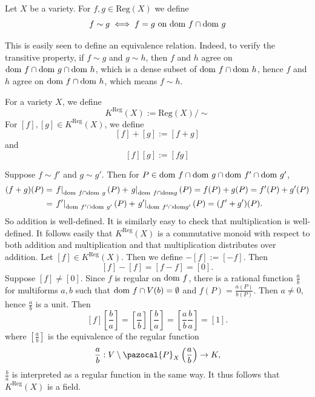     \begin{definition}
        Let $X$ be a variety. For $f,g\in \mathrm{Reg}(X)$ we define 
        $$
            f\sim g \iff f=g \text{ on } \mathrm{dom}\ f \cap \mathrm{dom} \ g
        $$
    \end{definition}
    \begin{remark}
        This is easily seen to define an equivalence relation. Indeed, to verify the transitive property, if $f\sim g$ and $g\sim h$, then $f$ and $h$ agree on $\dom\ f \cap \dom \ g\cap \dom\ h$, which is a dense subset of $\dom \ f \cap \dom \ h$, hence $f$ and $h$ agree on $\dom \ f \cap \dom \ h$, which means $f\sim h$.  
    \end{remark}
    \begin{definition}
        For a variety $X$, we define
        $$
            K^{\mathrm{Reg}}(X) := \mathrm{Reg}(X)/\sim
        $$
        For $[f],[g]\in K^\mathrm{Reg}(X)$, we define
        $$
            [f]+[g] := [f+g]
        $$
        and 
        $$
            [f][g] := [fg]
        $$
    \end{definition}
    \begin{remark}
        Suppose $f\sim f'$ and $g\sim g'$. Then for $P\in \mathrm{dom}\ f \cap \mathrm{dom} \ g \cap \mathrm{dom}\ f' \cap \mathrm{dom} \ g'$,
        \begin{align*}
            (f+g)(P) &= \left. f\right|_{\mathrm{dom}\ f\cap \mathrm{dom} \ g}(P) +\left. g\right|_{\mathrm{dom} \ f\cap \mathrm{dom} g}(P) = f(P)+g(P)= f'(P)+g'(P)\\
            &=\left. f'\right|_{\mathrm{dom}\ f'\cap \mathrm{dom} \ g'}(P) +\left. g'\right|_{\mathrm{dom} \ f'\cap \mathrm{dom} g'}(P) = (f'+g')(P).
        \end{align*}
        So addition is well-defined. It is similarly easy to check that multiplication is well-defined. It follows easily that $K^\mathrm{Reg}(X)$ is a commutative monoid with respect to both addition and multiplication and that multiplication distributes over addition. Let $[f]\in K^\mathrm{Reg}(X)$. Then we define $-[f]:= [-f]$. Then 
        $$
            [f]-[f]=[f-f]=[0].
        $$
        Suppose $[f]\neq [0]$. Since $f$ is regular on $\mathrm{dom}\ f$, there is a rational function $\frac{a}{b}$ for multiforms $a,b$ such that $\mathrm{dom}\ f \cap V(b)= \emptyset$ and $f(P) = \frac{a(P)}{b(P)}$. Then $a\neq 0$, hence $\frac{a}{b}$ is a unit. Then 
        $$
            [f]\left[\frac{b}{a}\right] = \left[\frac{a}{b}\right]\left[\frac{b}{a}\right] =\left[\frac{a}{b}\frac{b}{a}\right]=[1].
        $$
        where $\left[\frac{a}{b}\right]$ is the equivalence of the regular function 
        $$
            \frac{a}{b}: V\setminus \pazocal{P}_X\left(\frac{a}{b}\right) \rightarrow K,
        $$
        $\frac{b}{a}$ is interpreted as a regular function in the same way. It thus follows that $K^\mathrm{Reg}(X)$ is a field. 
    \end{remark}
